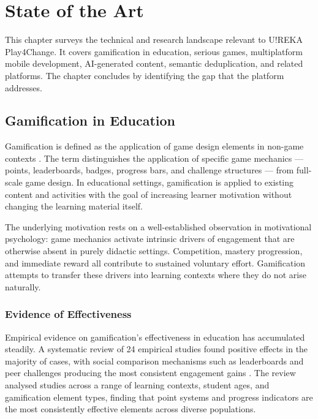 %
%
\chapter{State of the Art}
\label{chap:stateofart}

This chapter surveys the technical and research landscape relevant to U!REKA Play4Change. It covers gamification in education, serious games, multiplatform mobile development, AI-generated content, semantic deduplication, and related platforms. The chapter concludes by identifying the gap that the platform addresses.

\section{Gamification in Education}
\label{sec:gamification}

Gamification is defined as the application of game design elements in non-game contexts \cite{deterding2011gamification}. The term distinguishes the application of specific game mechanics --- points, leaderboards, badges, progress bars, and challenge structures --- from full-scale game design. In educational settings, gamification is applied to existing content and activities with the goal of increasing learner motivation without changing the learning material itself.

The underlying motivation rests on a well-established observation in motivational psychology: game mechanics activate intrinsic drivers of engagement that are otherwise absent in purely didactic settings. Competition, mastery progression, and immediate reward all contribute to sustained voluntary effort. Gamification attempts to transfer these drivers into learning contexts where they do not arise naturally.

\subsection{Evidence of Effectiveness}

Empirical evidence on gamification's effectiveness in education has accumulated steadily. A systematic review of 24 empirical studies found positive effects in the majority of cases, with social comparison mechanisms such as leaderboards and peer challenges producing the most consistent engagement gains \cite{hamari2014does}. The review analysed studies across a range of learning contexts, student ages, and gamification element types, finding that point systems and progress indicators are the most consistently effective elements across diverse populations.


